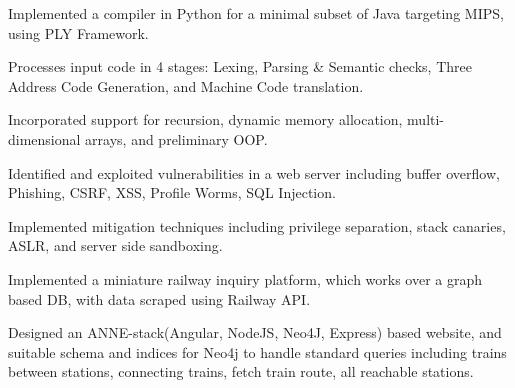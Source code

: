 \documentclass[a4paper]{norm-resume}
\begin{document}
 
\begin{tightitemize}
    \small
    {
    \item Implemented a compiler in Python for a minimal subset of Java targeting MIPS, using PLY Framework.
    \item Processes input code in 4 stages: Lexing, Parsing \& Semantic checks, Three Address Code Generation, and Machine Code translation.
    \item Incorporated support for recursion, dynamic memory allocation, multi-dimensional arrays, and preliminary OOP.
    }
\end{tightitemize}

\vspace{5mm}

     
\begin{tightitemize}
    \small
    {
    \item Identified and exploited vulnerabilities in a web server including buffer overflow, Phishing, CSRF, XSS, Profile Worms, SQL Injection.
    \item Implemented mitigation techniques including privilege separation, stack canaries, ASLR, and server side sandboxing.
    }
\end{tightitemize}

\vspace{5mm}

 
\begin{tightitemize}
        \small
        {
        \item Implemented a miniature railway inquiry platform, which works over a graph based DB, with data scraped using Railway API.
        \item Designed an ANNE-stack(Angular, NodeJS, Neo4J, Express) based website, and suitable schema and indices for Neo4j to handle standard queries including trains between stations, connecting trains, fetch train route, all reachable stations.
        }
\end{tightitemize}
\end{document}
